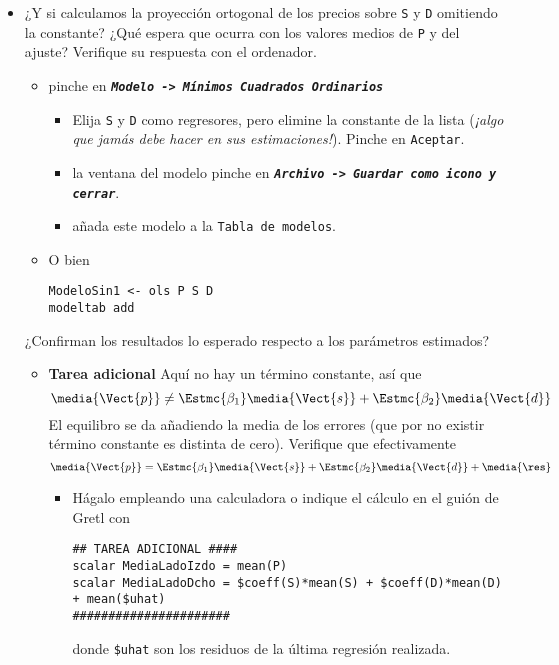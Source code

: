 \documentclass[11pt]{article}
\begin{document}
\begin{itemize}
\item ¿Y si calculamos la proyección ortogonal de los precios sobre \texttt{S}
y \texttt{D} omitiendo la constante? ¿Qué espera que ocurra con los valores medios de \texttt{P}
y del ajuste? Verifique su respuesta con el ordenador.

\begin{itemize}
\item pinche en \textbf{\emph{\texttt{Modelo -> Mínimos Cuadrados Ordinarios}}}

\begin{itemize}
\item Elija \texttt{S} y \texttt{D} como regresores, pero elimine la constante de la
lista (\emph{¡algo que jamás debe hacer en sus
estimaciones!}). Pinche en \texttt{Aceptar}.

\item la ventana del modelo pinche en \textbf{\emph{\texttt{Archivo -> Guardar como icono y cerrar}}}.

\item añada este modelo a la \texttt{Tabla de modelos}.
\end{itemize}

\item O bien 
\begin{verbatim}
ModeloSin1 <- ols P S D
modeltab add
\end{verbatim}
\end{itemize}

¿Confirman los resultados lo esperado respecto a los parámetros estimados?

\begin{itemize}
\item \textbf{Tarea adicional} Aquí no hay un término constante, así que
\[\media{\Vect{p}} \ne \Estmc{\beta_1}\media{\Vect{s}} + \Estmc{\beta_2}\media{\Vect{d}}\]
El equilibro se da añadiendo la media de los errores (que por no
existir término constante es distinta de cero).  Verifique que
efectivamente
\[\media{\Vect{p}} = \Estmc{\beta_1}\media{\Vect{s}} + \Estmc{\beta_2}\media{\Vect{d}} + \media{\res}\]

\begin{itemize}
\item Hágalo empleando una calculadora o indique el cálculo en el guión de Gretl con
\begin{verbatim}
## TAREA ADICIONAL ####
scalar MediaLadoIzdo = mean(P)
scalar MediaLadoDcho = $coeff(S)*mean(S) + $coeff(D)*mean(D) + mean($uhat)
######################	 
\end{verbatim}
donde \texttt{\$uhat} son los residuos de la  última regresión realizada.
\end{itemize}


\end{itemize}
\end{itemize}
\end{document}
